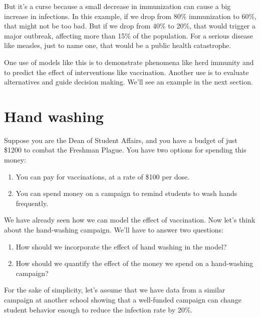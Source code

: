 \documentclass[12pt]{book}
\theoremstyle{exercise}
\begin{document}
But it's a curse because a small decrease in immunization can cause a big increase in infections.  In this example, if we drop from 80\% immunization to 60\%, that might not be too bad.  But if we drop from 40\% to 20\%, that would trigger a major outbreak, affecting more than 15\% of the population.  For a serious disease like measles, just to name one, that would be a public health catastrophe.

One use of models like this is to demonstrate phenomena like herd immunity and to predict the effect of interventions like vaccination.  Another use is to evaluate alternatives and guide decision making.  We'll see an example in the next section.


\section{Hand washing}

Suppose you are the Dean of Student Affairs, and you have a budget of just \$1200 to combat the Freshman Plague.  You have two options for spending this money:

\begin{enumerate}

\item You can pay for vaccinations, at a rate of \$100 per dose.

\item You can spend money on a campaign to remind students to wash hands frequently.

\end{enumerate}

We have already seen how we can model the effect of vaccination.  Now let's think about the hand-washing campaign.  We'll have to answer two questions:

\begin{enumerate}

\item How should we incorporate the effect of hand washing in the model?

\item How should we quantify the effect of the money we spend on a hand-washing campaign?

\end{enumerate}

For the sake of simplicity, let's assume that we have data from a similar campaign at another school showing that a well-funded campaign can change student behavior enough to reduce the infection rate by 20\%.  
\end{document}
